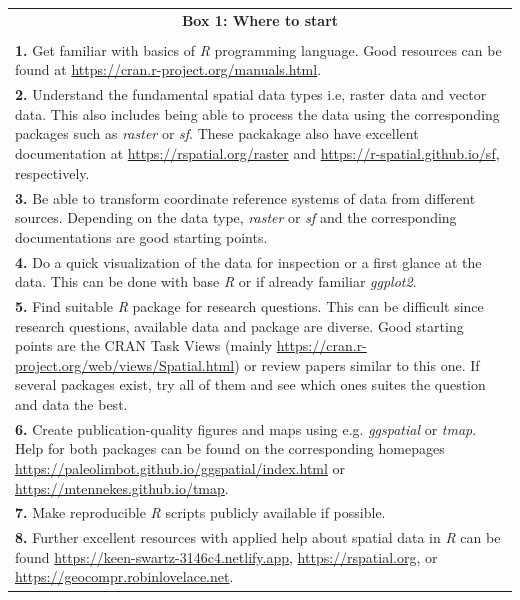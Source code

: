 \documentclass[smallextended]{svjour3}       %
\begin{document}
\begin{table}

\small

\begin{tabularx}{1\textwidth}{|X|}

\hline
\multicolumn{1}{|c|}{\textbf{Box 1: Where to start}} \\

\\

\textbf{1.} Get familiar with basics of \textit{R} programming language. 
Good resources can be found at \url{https://cran.r-project.org/manuals.html}. \\

\textbf{2.} Understand the fundamental spatial data types i.e, raster data and vector data.
This also includes being able to process the data using the corresponding packages such as \textit{raster} or \textit{sf}. 
These packakage also have excellent documentation at \url{https://rspatial.org/raster} and \url{https://r-spatial.github.io/sf}, respectively. \\

\textbf{3.} Be able to transform coordinate reference systems of data from different sources. Depending on the data type, \textit{raster} or \textit{sf} and the corresponding documentations are good starting points. \\

\textbf{4.} Do a quick visualization of the data for inspection or a first glance at the data. 
This can be done with base \textit{R} or if already familiar \textit{ggplot2}. \\

\textbf{5.} Find suitable \textit{R} package for research questions. 
This can be difficult since research questions, available data and package are diverse. 
Good starting points are the CRAN Task Views (mainly \url{https://cran.r-project.org/web/views/Spatial.html}) or review papers similar to this one. 
If several packages exist, try all of them and see which ones suites the question and data the best. \\

\textbf{6.} Create publication-quality figures and maps using e.g. \textit{ggspatial} or \textit{tmap}. 
Help for both packages can be found on the corresponding homepages \url{https://paleolimbot.github.io/ggspatial/index.html} or \url{https://mtennekes.github.io/tmap}. \\

\textbf{7.} Make reproducible \textit{R} scripts publicly available if possible. \\

\textbf{8.} Further excellent resources with applied help about spatial data in \textit{R} can be found \url{https://keen-swartz-3146c4.netlify.app}, \url{https://rspatial.org}, or \url{https://geocompr.robinlovelace.net}. \\

\hline
\end{tabularx}
\end{table}
\end{document}
